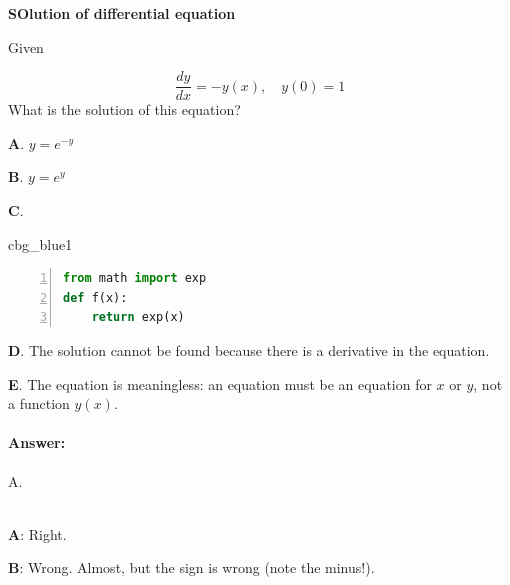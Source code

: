 \n\documentclass[%
oneside,                 %
final,                   %
10pt]{article}
\newenvironment{_cod_tight}[1]{
   \def\FrameCommand{\colorbox{#1}}
   \FrameRule0.6pt\MakeFramed {\FrameRestore}\vskip3mm}
   {\vskip0mm\endMakeFramed}
\newenvironment{cod}[1]{
\bgroup\rmfamily
\fboxsep=0mm\relax
\begin{_cod_tight}{#1}
\list{}{\parsep=-2mm\parskip=0mm\topsep=0pt\leftmargin=2mm
\rightmargin=2\leftmargin\leftmargin=4pt\relax}
\item\relax}
{\endlist\end{_cod_tight}\egroup}
\newenvironment{doconcequiz}{}{}
\newcounter{doconcequizcounter}
\newenvironment{doconceexercise}{}{}
\newcounter{doconceexercisecounter}
\theoremstyle{definition}
\begin{document}
\begin{enumerate}
\begin{doconceexercise}
\end{doconceexercise}

\begin{doconceexercise}

                             
\label{sec:this:exer:de}


\begin{doconcequiz}
\label{quiz:diff:eq1}


\noindent\textbf{\large SOlution of differential equation}

\noindent
Given

\[ \frac{dy}{dx} = -y(x),\quad y(0)=1 \]
What is the solution of this equation?

\vspace{2mm}

\textbf{A}. 
$y=e^{-y}$

\textbf{B}. 
$y=e^{y}$

\textbf{C}. 
\begin{cod}{cbg_blue1}\begin{lstlisting}[language=python,style=myspeciallststyle,numbers=left,numberstyle=\tiny,stepnumber=3,numbersep=15pt,xleftmargin=1mm]
from math import exp
def f(x):
    return exp(x)

\end{lstlisting}\end{cod}
\noindent

\textbf{D}. 
The solution cannot be found because there is a derivative in the equation.

\textbf{E}. 
The equation is meaningless: an equation must be an equation
for $x$ or $y$, not a function $y(x)$.


\paragraph{Answer:} A.

\\


\textbf{A}: Right. 

\textbf{B}: Wrong. Almost, but the sign is wrong (note the minus!).


\end{doconcequiz}
\end{doconceexercise}
\end{enumerate}
\end{document}
